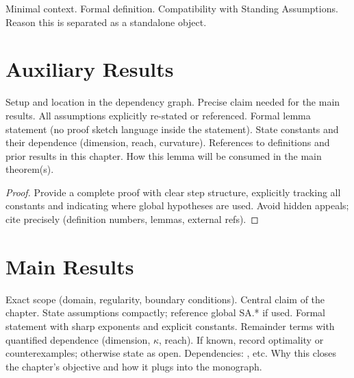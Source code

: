 \begin{definition}\label{def:<aux-label>}
\Orientation Minimal context.
\Statement Formal definition.
\Audit Compatibility with Standing Assumptions.
\Closure Reason this is separated as a standalone object.
\end{definition}

\section{Auxiliary Results}

\begin{lemma}\label{lem:<label>}
\Orientation Setup and location in the dependency graph.
\Objectives Precise claim needed for the main results.
\Invariants All assumptions explicitly re-stated or referenced.
\Statement Formal lemma statement (no proof sketch language inside the statement).
\ErrorBounds State constants and their dependence (dimension, reach, curvature).
\Audit References to definitions and prior results in this chapter.
\Closure How this lemma will be consumed in the main theorem(s).
\end{lemma}

\begin{proof}
Provide a complete proof with clear step structure, explicitly tracking
all constants and indicating where global hypotheses are used.
Avoid hidden appeals; cite precisely (definition numbers, lemmas, external refs).
\end{proof}

\section{Main Results}

\begin{theorem}\label{thm:<label>}
\Orientation Exact scope (domain, regularity, boundary conditions).
\Objectives Central claim of the chapter.
\Invariants State assumptions compactly; reference global SA.* if used.
\Statement Formal statement with sharp exponents and explicit constants.
\ErrorBounds Remainder terms with quantified dependence (dimension, $\kappa$, reach).
\Optimality If known, record optimality or counterexamples; otherwise state as open.
\Audit Dependencies: , etc.
\Closure Why this closes the chapter’s objective and how it plugs into the monograph.
\end{theorem}

